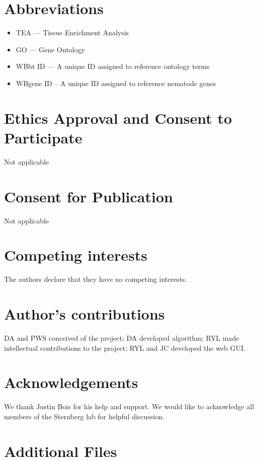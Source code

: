 \documentclass{bmcart}
\begin{document}
\begin{backmatter}
\section*{Abbreviations}

\begin{itemize}
	\item TEA --- Tissue Enrichment Analysis
	\item GO --- Gene Ontology
	\item WBbt ID --- A unique ID assigned to reference ontology terms
	\item WBgene ID -- A unique ID assigned to reference nematode genes
\end{itemize}


\section*{Ethics Approval and Consent to Participate}

Not applicable

\section*{Consent for Publication}

Not applicable

\section*{Competing interests}
 	The authors declare that they have no competing interests.
\section*{Author's contributions}
    DA and PWS conceived of the project; DA developed algorithm;
	RYL made intellectual contributions to the project; RYL and JC
	developed the web GUI.
\section*{Acknowledgements}
	We thank Justin Bois for his help and support. 
	We would like to acknowledge all members of the Sternberg
	lab for helpful discussion.
	
\section*{Additional Files}

\end{backmatter}
\end{document}
